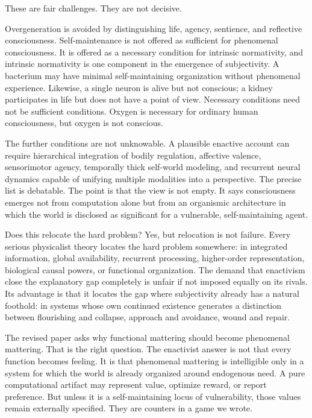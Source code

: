 \documentclass[11pt]{article}
\begin{document}
These are fair challenges. They are not decisive.

Overgeneration is avoided by distinguishing life, agency, sentience, and reflective consciousness. Self-maintenance is not offered as sufficient for phenomenal consciousness. It is offered as a necessary condition for intrinsic normativity, and intrinsic normativity is one component in the emergence of subjectivity. A bacterium may have minimal self-maintaining organization without phenomenal experience. Likewise, a single neuron is alive but not conscious; a kidney participates in life but does not have a point of view. Necessary conditions need not be sufficient conditions. Oxygen is necessary for ordinary human consciousness, but oxygen is not conscious.

The further conditions are not unknowable. A plausible enactive account can require hierarchical integration of bodily regulation, affective valence, sensorimotor agency, temporally thick self-world modeling, and recurrent neural dynamics capable of unifying multiple modalities into a perspective. The precise list is debatable. The point is that the view is not empty. It says consciousness emerges not from computation alone but from an organismic architecture in which the world is disclosed as significant for a vulnerable, self-maintaining agent.

Does this relocate the hard problem? Yes, but relocation is not failure. Every serious physicalist theory locates the hard problem somewhere: in integrated information, global availability, recurrent processing, higher-order representation, biological causal powers, or functional organization. The demand that enactivism close the explanatory gap completely is unfair if not imposed equally on its rivals. Its advantage is that it locates the gap where subjectivity already has a natural foothold: in systems whose own continued existence generates a distinction between flourishing and collapse, approach and avoidance, wound and repair.

The revised paper asks why functional mattering should become phenomenal mattering. That is the right question. The enactivist answer is not that every function becomes feeling. It is that phenomenal mattering is intelligible only in a system for which the world is already organized around endogenous need. A pure computational artifact may represent value, optimize reward, or report preference. But unless it is a self-maintaining locus of vulnerability, those values remain externally specified. They are counters in a game we wrote.
\end{document}
